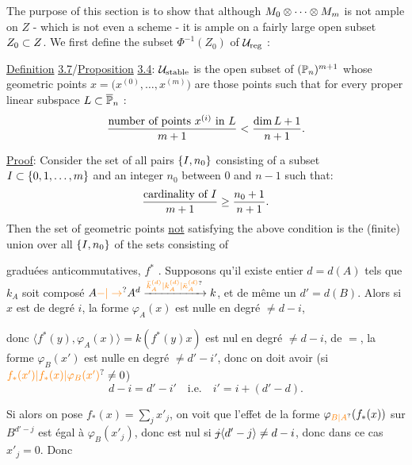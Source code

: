  The purpose of this section is to show that although $M_0\otimes\cdots\otimes M_m$ is not ample on $Z$ - which is not even a scheme - it is ample on a fairly large open subset $Z_0\subset Z$. We first define the subset $\Phi^{-1}(Z_0)$ of $\mathcal U_{\mathrm{reg}}$ :

\uline{Definition} \uline{3.7}/\uline{Proposition} \uline{3.4}: $\mathcal U_{\mathrm{stable}}$ is the open subset of $(\mathbb P_n)^{m+1}$ whose geometric points $x=\bigl(x^{(0)},\ldots,x^{(m)}\bigr)$ are those points such that for every proper linear subspace $L\subset\overline{\mathbb P}_n$ :
\[
\frac{\text{number of points }x^{(i)}\text{ in }L}{m+1}<\frac{\dim L+1}{n+1}.
\]

\uline{Proof}: Consider the set of all pairs $\{I,n_0\}$ consisting of a subset $I\subset\{0,1,\ldots,m\}$ and an integer $n_0$ between $0$ and $n-1$ such that:
\[
\frac{\text{cardinality of }I}{m+1}\geq\frac{n_0+1}{n+1}.
\]
Then the set of geometric points \uline{not} satisfying the above condition is the (finite) union over all $\{I,n_0\}$ of the sets consisting of

graduées anticommutatives, $f^*$ . Supposons qu'il existe  entier $d=d(A)$ tels que $k_A$ soit composé $A\unsure{-|\to}A^d\xrightarrow{\unsure{\bar k_A^{(d)}|k_A^{(d)}|\bar{\kappa}_A^{(d)}}} k$, et de même un $d'=d(B)$. Alors si $x$ est de degré $i$, la forme $\varphi_A(x)$ est nulle en degré $\ne d-i$,

donc $\langle f^*(y),\varphi_A(x)\rangle=k(f^*(y)x)$ est nul  en degré $\ne d-i$,  de $=$,  la forme $\varphi_B(x')$ est nulle en degré $\ne d'-i'$, donc on doit avoir (si $\unsure{f_*(x')|f_*(x)|\varphi_B(x')}\ne0$)
\[
d-i=d'-i'\quad\text{i.e.}\quad i'=i+(d'-d).
\]

Si alors on pose $f_*(x)=\sum_j x'_j$, on voit que l'effet de la forme $\varphi_{\unsure{B|A}}(f_*(x))$ sur $B^{d'-j}$ est égal à $\varphi_B(x'_j)$, donc est nul si $\deleted{j}\inserted{d'-j}\ne d-i$, donc dans ce cas $x'_j=0$. Donc

